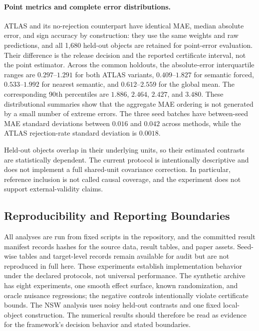 \documentclass[11pt]{article}
\numberwithin{equation}{section}
\newcommand{\1}{\mathbf 1}
\begin{document}
\paragraph{Point metrics and complete error distributions.}
ATLAS and its no-rejection counterpart have identical MAE, median absolute error, and sign accuracy by construction: they use the same weights and raw predictions, and all 1,680 held-out objects are retained for point-error evaluation.  Their difference is the release decision and the reported certificate interval, not the point estimator.  Across the common holdouts, the absolute-error interquartile ranges are $0.297$--$1.291$ for both ATLAS variants, $0.409$--$1.827$ for semantic forced, $0.533$--$1.992$ for nearest semantic, and $0.612$--$2.559$ for the global mean.  The corresponding 90th percentiles are $1.886$, $2.464$, $2.427$, and $3.480$.  These distributional summaries show that the aggregate MAE ordering is not generated by a small number of extreme errors.  The three seed batches have between-seed MAE standard deviations between $0.016$ and $0.042$ across methods, while the ATLAS rejection-rate standard deviation is $0.0018$.

Held-out objects overlap in their underlying units, so their estimated contrasts are statistically dependent.  The current protocol is intentionally descriptive and does not implement a full shared-unit covariance correction.  In particular, reference inclusion is not called causal coverage, and the experiment does not support external-validity claims.


\subsection*{Reproducibility and Reporting Boundaries}
All analyses are run from fixed scripts in the repository, and the committed result manifest records hashes for the source data, result tables, and paper assets.  Seed-wise tables and target-level records remain available for audit but are not reproduced in full here.  These experiments establish implementation behavior under the declared protocols, not universal performance.  The synthetic archive has eight experiments, one smooth effect surface, known randomization, and oracle nuisance regressions; the negative controls intentionally violate certificate bounds.  The NSW analysis uses noisy held-out contrasts and one fixed local-object construction.  The numerical results should therefore be read as evidence for the framework's decision behavior and stated boundaries.
\end{document}
